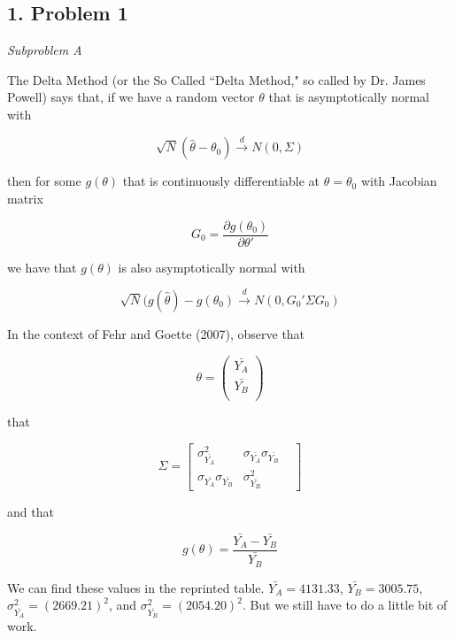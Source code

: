 \documentclass[11pt]{article}
\begin{document}
\begin{center}
\end{center}

\subsection*{1. Problem 1}

\bigskip \textit{Subproblem A}

\bigskip The Delta Method (or the So Called ``Delta Method," so called by Dr. James Powell) says that, if we have a random vector $\theta$ that is asymptotically normal with

\[\sqrt{N}(\hat{\theta}-\theta_0) \overset{d}{\to} N(0,\Sigma)\]

then for some $g(\theta)$ that is continuously differentiable at $\theta=\theta_0$ with Jacobian matrix

\[G_0=\frac{\partial g(\theta_0)}{\partial \theta'}\]

we have that $g(\theta)$ is also asymptotically normal with

\[\sqrt{N}(g(\hat{\theta})-g(\theta_0) \overset{d}{\to} N(0,G_0' \Sigma G_0)\]

In the context of Fehr and Goette (2007), observe that

\[\theta =
\left(
\begin{array}{c}
	\bar{Y_A}\\
	\bar{Y_B}\\
\end{array}
\right)\]

that

\[\Sigma=
\begin{bmatrix}
\sigma_{\bar{Y_A}}^2 & \sigma_{\bar{Y_A}}\sigma_{\bar{Y_B}} & \\
\sigma_{\bar{Y_A}}\sigma_{\bar{Y_B}} & \sigma_{\bar{Y_B}}^2 &
\end{bmatrix}\]

and that

\[g(\theta)=\frac{\bar{Y_A}-\bar{Y_B}}{\bar{Y_B}}\]

We can find these values in the reprinted table. $\bar{Y_A}=4131.33$, $\bar{Y_B}=3005.75$, $\sigma_{\bar{Y_A}}^2=(2669.21)^2$, and $\sigma_{\bar{Y_B}}^2=(2054.20)^2$. But we still have to do a little bit of work.
\end{document}
